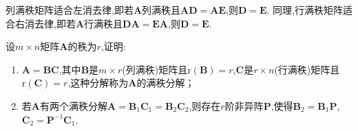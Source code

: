 \documentclass[../../main.tex]{subfiles}%
\begin{document}
\begin{corollary}\label{corollary:列满秩矩阵适合左消去律/行满秩矩阵适合右消去律}
列满秩矩阵适合左消去律,即若\(\boldsymbol{A}\)列满秩且\(\boldsymbol{A}\boldsymbol{D}=\boldsymbol{A}\boldsymbol{E}\),则\(\boldsymbol{D}=\boldsymbol{E}\). 同理,行满秩矩阵适合右消去律,即若\(\boldsymbol{A}\)行满秩且\(\boldsymbol{D}\boldsymbol{A}=\boldsymbol{E}\boldsymbol{A}\),则\(\boldsymbol{D}=\boldsymbol{E}\).
\end{corollary}

\begin{proposition}[满秩分解]\label{proposition:矩阵的满秩分解}
设\(m\times n\)矩阵\(\boldsymbol{A}\)的秩为\(r\),证明:
\begin{enumerate}[(1)]
\item \(\boldsymbol{A}=\boldsymbol{B}\boldsymbol{C}\),其中\(\boldsymbol{B}\)是\(m\times r\)(列满秩)矩阵且\(\mathrm{r}(\boldsymbol{B}) = r\),\(\boldsymbol{C}\)是\(r\times n\)(行满秩)矩阵且\(\mathrm{r}(\boldsymbol{C}) = r\),这种分解称为\(\boldsymbol{A}\)的满秩分解；
\item 若\(\boldsymbol{A}\)有两个满秩分解\(\boldsymbol{A}=\boldsymbol{B}_1\boldsymbol{C}_1=\boldsymbol{B}_2\boldsymbol{C}_2\),则存在\(r\)阶非异阵\(\boldsymbol{P}\),使得\(\boldsymbol{B}_2=\boldsymbol{B}_1\boldsymbol{P}\),\(\boldsymbol{C}_2=\boldsymbol{P}^{-1}\boldsymbol{C}_1\).
\end{enumerate}
\end{proposition}
\end{document}
